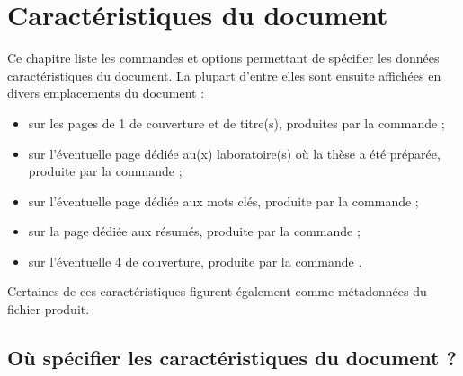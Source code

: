 \chapter{Caractéristiques du document}
\label{cha:caract-du-docum}

Ce chapitre liste les commandes et options permettant de spécifier les données
caractéristiques du document. La plupart d'entre elles sont ensuite affichées
en divers emplacements du document :
\begin{itemize}
\item sur les pages de 1\iere{} de couverture et de titre(s), produites par la
  commande  ;
\item sur l'éventuelle page dédiée au(x) laboratoire(s) où la thèse a été préparée,
  produite par la commande  ;
\item sur l'éventuelle page dédiée aux mots clés, produite par la commande  ;
\item sur la page dédiée aux résumés, produite par la commande  ;
\item sur l'éventuelle 4\ieme{} de couverture, produite par la commande
  .
\end{itemize}
Certaines de ces caractéristiques figurent également comme métadonnées du fichier
\pdf produit.

\section{Où spécifier les caractéristiques du document ?}
\label{sec:lieu-de-saisie}

